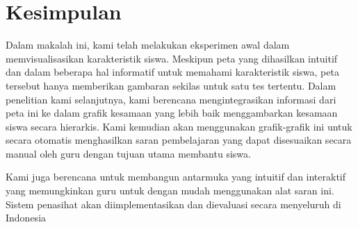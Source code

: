 \section{Kesimpulan}

    Dalam makalah ini, kami telah melakukan eksperimen awal dalam memvisualisasikan karakteristik siswa. Meskipun peta yang dihasilkan intuitif dan dalam beberapa hal informatif untuk memahami karakteristik siswa, peta tersebut hanya memberikan gambaran sekilas untuk satu tes tertentu. Dalam penelitian kami selanjutnya, kami berencana mengintegrasikan informasi dari peta ini ke dalam grafik kesamaan yang lebih baik menggambarkan kesamaan siswa secara hierarkis. Kami kemudian akan menggunakan grafik-grafik ini untuk secara otomatis menghasilkan saran pembelajaran yang dapat disesuaikan secara manual oleh guru dengan tujuan utama membantu siswa.
    
    Kami juga berencana untuk membangun antarmuka yang intuitif dan interaktif yang memungkinkan guru untuk dengan mudah menggunakan alat saran ini. Sistem penasihat akan diimplementasikan dan dievaluasi secara menyeluruh di Indonesia
